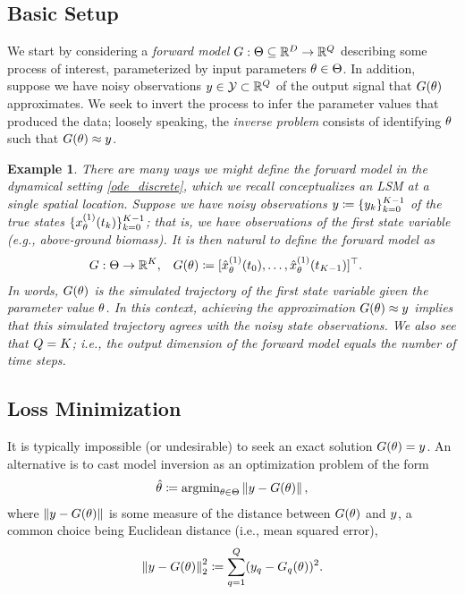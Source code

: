 \documentclass[12pt]{article}
\newtheorem{example}{Example}
\begin{document}
\subsection{Basic Setup}
We start by considering a \textit{forward model} $\fwd: \parSpace \subseteq \R^{\dimPar} \to \R^{\dimObs}$ describing some 
process of interest, parameterized by input parameters $\Par \in \parSpace$. In addition, suppose we have noisy 
observations $\obs \in \obsSpace \subset \R^{\dimObs}$ of the output signal that $\fwd(\Par)$ approximates. 
We seek to invert the process to infer the parameter values that produced the data; loosely speaking, the 
\textit{inverse problem} consists of identifying $\Par$ such that $\fwd(\Par) \approx \obs$. 

\begin{example}
There are many ways we might define the forward model in the dynamical setting \ref{ode_discrete}, which we recall 
conceptualizes an LSM at a single spatial location. Suppose we have noisy observations 
$\obs \Def \{\indexTime{\obs}\}_{\timeIdx=0}^{\Ntime-1}$ 
of the true states $\{\indexState[1]{\state}_{\Par}(\indexTime{\Time})\}_{\timeIdx=0}^{\Ntime-1}$; that is, we have observations of 
the first state variable (e.g., above-ground biomass). It is then natural to define the forward model as 
\begin{align}
&\fwd: \parSpace \to \R^{\Ntime}, && \fwd(\Par) 
\Def [\indexState[1]{\stateApprox}_{\Par}(\indexTime[0]{\Time}), \dots, \indexState[1]{\stateApprox}_{\Par}(\indexTime[\Ntime-1]{\Time})]^\top. \label{fwd_model}
\end{align}
In words, $\fwd(\Par)$ is the simulated trajectory of the first state variable given the parameter value $\Par$. In this context, achieving 
the approximation $\fwd(\Par) \approx \obs$ implies that this simulated trajectory agrees with the noisy state observations. We also 
see that $\dimObs = \Ntime$; i.e., the output dimension of the forward model equals the number of time steps. 
\end{example}

\subsection{Loss Minimization}
It is typically impossible (or undesirable) to seek an exact solution $\fwd(\Par) = \obs$. An alternative is to cast 
model inversion as an optimization problem of the form 
\begin{align}
\parEst \Def \text{argmin}_{\Par \in \parSpace} \norm{\obs - \fwd(\Par)},
\end{align}
where $\norm{\obs - \fwd(\Par)}$ is some measure of the distance between $\fwd(\Par)$ and $\obs$, a common choice being 
Euclidean distance (i.e., mean squared error),
\begin{align}
\norm{\obs - \fwd(\Par)}^2_2 \Def \sum_{\obsIdx=1}^{\dimObs} (\obs_{\obsIdx} - \fwd_{\obsIdx}(\Par))^2. 
\end{align}
\end{document}
